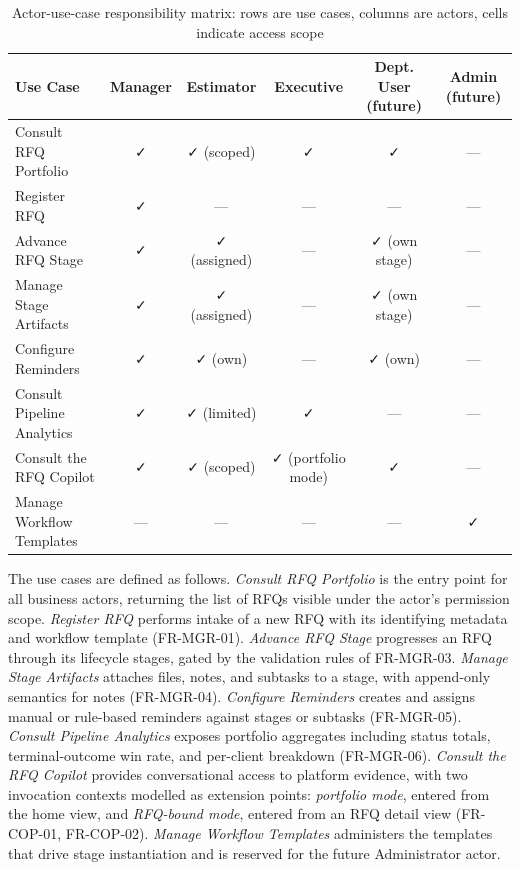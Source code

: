 \begin{table}[H]
\centering
\renewcommand{\arraystretch}{1.3}
\scriptsize
\begin{tabularx}{\textwidth}{|>{\RaggedRight\arraybackslash}X|c|c|c|c|c|}
\hline
\rowcolor{lightgray}
\textbf{Use Case} & \textbf{Manager} & \textbf{Estimator} & \textbf{Executive} & \textbf{Dept. User (future)} & \textbf{Admin (future)} \\ \hline
Consult RFQ Portfolio & ✓ & ✓ (scoped) & ✓ & ✓ & --- \\ \hline
Register RFQ & ✓ & --- & --- & --- & --- \\ \hline
Advance RFQ Stage & ✓ & ✓ (assigned) & --- & ✓ (own stage) & --- \\ \hline
Manage Stage Artifacts & ✓ & ✓ (assigned) & --- & ✓ (own stage) & --- \\ \hline
Configure Reminders & ✓ & ✓ (own) & --- & ✓ (own) & --- \\ \hline
Consult Pipeline Analytics & ✓ & ✓ (limited) & ✓ & --- & --- \\ \hline
Consult the RFQ Copilot & ✓ & ✓ (scoped) & ✓ (portfolio mode) & ✓ & --- \\ \hline
Manage Workflow Templates & --- & --- & --- & --- & ✓ \\ \hline
\end{tabularx}
\caption{Actor-use-case responsibility matrix: rows are use cases, columns are actors, cells indicate access scope}
\label{tab:use_case_matrix}
\end{table}

The use cases are defined as follows. \textit{Consult RFQ Portfolio}
is the entry point for all business actors, returning the list of
RFQs visible under the actor's permission scope. \textit{Register RFQ}
performs intake of a new RFQ with its identifying metadata and
workflow template (FR-MGR-01). \textit{Advance RFQ Stage} progresses
an RFQ through its lifecycle stages, gated by the validation rules of
FR-MGR-03. \textit{Manage Stage Artifacts} attaches files, notes, and
subtasks to a stage, with append-only semantics for notes (FR-MGR-04).
\textit{Configure Reminders} creates and assigns manual or rule-based
reminders against stages or subtasks (FR-MGR-05). \textit{Consult
Pipeline Analytics} exposes portfolio aggregates including status
totals, terminal-outcome win rate, and per-client breakdown
(FR-MGR-06). \textit{Consult the RFQ Copilot} provides conversational
access to platform evidence, with two invocation contexts modelled as
extension points: \textit{portfolio mode}, entered from the home view,
and \textit{RFQ-bound mode}, entered from an RFQ detail view
(FR-COP-01, FR-COP-02). \textit{Manage Workflow Templates}
administers the templates that drive stage instantiation and is
reserved for the future Administrator actor.

